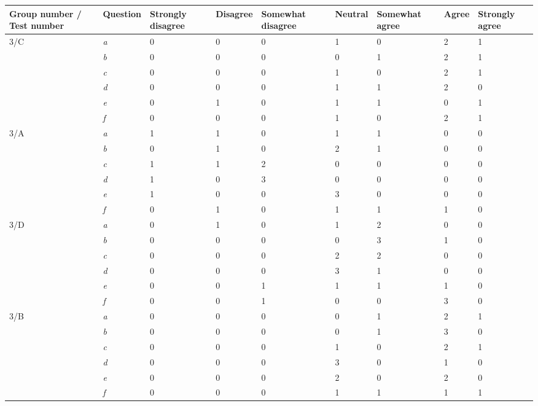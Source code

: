 \begin{center}\small \label{Test3}
	\begin{tabular}{ p{1.4cm} | p{1.4cm} | p{1.3cm} | p{1.4cm} | p{1.7cm} | p{1.2cm} | p{1.7cm} | p{0.9cm}| p{1.3cm} |}
\hline
\textbf{Group number / Test 	number} &\textbf{Question}	&	\textbf{Strongly disagree}	&	\textbf{Disagree}	&	\textbf{Somewhat disagree}	&	\textbf{Neutral}	&	\textbf{Somewhat agree}	&	\textbf{Agree}	&	\textbf{Strongly agree} \\ \hline
3/C		&	\textit{a}	&	0	&	0	&	0	&	1	&	0	&	2	&	1	\\ \hline
		&	\textit{b}	&	0	&	0	&	0	&	0	&	1	&	2	&	1	\\ \hline
		&	\textit{c}	&	0	&	0	&	0	&	1	&	0	&	2	&	1	\\ \hline
		&	\textit{d}	&	0	&	0	&	0	&	1	&	1	&	2	&	0	\\ \hline
		&	\textit{e}	&	0	&	1	&	0	&	1	&	1	&	0	&	1	\\ \hline
		&	\textit{f}	&	0	&	0	&	0	&	1	&	0	&	2	&	1	\\ \hline
3/A		&	\textit{a}	&	1	&	1	&	0	&	1	&	1	&	0	&	0	\\ \hline
		&	\textit{b}	&	0	&	1	&	0	&	2	&	1	&	0	&	0	\\ \hline
		&	\textit{c}	&	1	&	1	&	2	&	0	&	0	&	0	&	0	\\ \hline
		&	\textit{d}	&	1	&	0	&	3	&	0	&	0	&	0	&	0	\\ \hline
		&	\textit{e}	&	1	&	0	&	0	&	3	&	0	&	0	&	0	\\ \hline
		&	\textit{f}	&	0	&	1	&	0	&	1	&	1	&	1	&	0	\\ \hline
3/D		&	\textit{a}	&	0	&	1	&	0	&	1	&	2	&	0	&	0	\\ \hline
		&	\textit{b}	&	0	&	0	&	0	&	0	&	3	&	1	&	0	\\ \hline
		&	\textit{c}	&	0	&	0	&	0	&	2	&	2	&	0	&	0	\\ \hline
		&	\textit{d}	&	0	&	0	&	0	&	3	&	1	&	0	&	0	\\ \hline
		&	\textit{e}	&	0	&	0	&	1	&	1	&	1	&	1	&	0	\\ \hline
		&	\textit{f}	&	0	&	0	&	1	&	0	&	0	&	3	&	0	\\ \hline
3/B		&	\textit{a}	&	0	&	0	&	0	&	0	&	1	&	2	&	1	\\ \hline
		&	\textit{b}	&	0	&	0	&	0	&	0	&	1	&	3	&	0	\\ \hline
		&	\textit{c}	&	0	&	0	&	0	&	1	&	0	&	2	&	1	\\ \hline
		&	\textit{d}	&	0	&	0	&	0	&	3	&	0	&	1	&	0	\\ \hline
		&	\textit{e}	&	0	&	0	&	0	&	2	&	0	&	2	&	0	\\ \hline
		&	\textit{f}	&	0	&	0	&	0	&	1	&	1	&	1	&	1	\\ \hline
	\end{tabular}
\end{center}		
		
